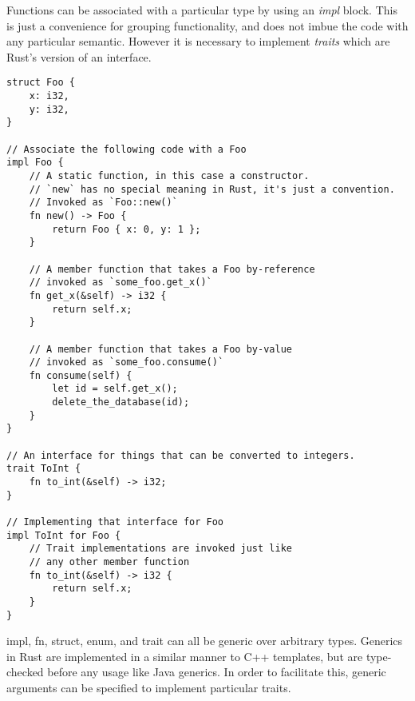 Functions can be associated with a particular type by using an \emph{impl}
block. This is just a convenience for grouping functionality, and does not
imbue the code with any particular semantic. However it is necessary to
implement \emph{traits} which are Rust's version of an interface.

\begin{verbatim}
struct Foo {
    x: i32,
    y: i32,
}

// Associate the following code with a Foo
impl Foo {
    // A static function, in this case a constructor.
    // `new` has no special meaning in Rust, it's just a convention.
    // Invoked as `Foo::new()`
    fn new() -> Foo {
        return Foo { x: 0, y: 1 };
    }

    // A member function that takes a Foo by-reference
    // invoked as `some_foo.get_x()`
    fn get_x(&self) -> i32 {
        return self.x;
    }

    // A member function that takes a Foo by-value
    // invoked as `some_foo.consume()`
    fn consume(self) {
        let id = self.get_x();
        delete_the_database(id);
    }
}

// An interface for things that can be converted to integers.
trait ToInt {
    fn to_int(&self) -> i32;
}

// Implementing that interface for Foo
impl ToInt for Foo {
    // Trait implementations are invoked just like
    // any other member function
    fn to_int(&self) -> i32 {
        return self.x;
    }
}
\end{verbatim}



impl, fn, struct, enum, and trait can all be generic over arbitrary types.
Generics in Rust are implemented in a similar manner to C++ templates, but
are type-checked before any usage like Java generics. In order to facilitate
this, generic arguments can be specified to implement particular traits.

